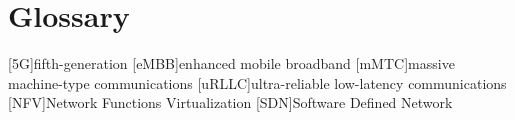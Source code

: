 \chapter{Glossary}

\footnotesize
\SingleSpacing

\begin{multicols}{2}
\begin{acronym}[AAAAAA]

	[5G]{fifth-generation}
	[eMBB]{enhanced mobile broadband}
	[mMTC]{massive machine-type communications}
	[uRLLC]{ultra-reliable low-latency communications}
	[NFV]{Network Functions Virtualization}
	[SDN]{Software Defined Network}

\end{acronym}
\end{multicols}

